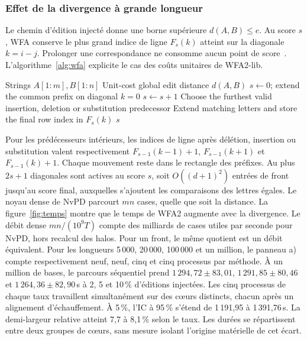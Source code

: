 \subsubsection{Effet de la divergence à grande longueur}
Le chemin d'édition injecté donne une borne supérieure \(d(A,B)\le e\). Au score \(s\), WFA conserve le plus grand indice de ligne \(F_s(k)\) atteint sur la diagonale \(k=i-j\). Prolonger une correspondance ne consomme aucun point de score~\cite{wfa}.
L'algorithme~\ref{alg:wfa} explicite le cas des coûts unitaires de WFA2-lib.
\begin{algorithm}[!htbp]
\caption{Progression d'un front à coûts unitaires}\label{alg:wfa}
\begin{algorithmic}[1]
\Require Strings \(A[1:m],B[1:n]\)
\Ensure Unit-cost global edit distance \(d(A,B)\)
\State \(s\gets0\); extend the common prefix on diagonal \(k=0\)
  \State \(s\gets s+1\)
    \State Choose the furthest valid insertion, deletion or substitution predecessor
    \State Extend matching letters and store the final row index in \(F_s(k)\)
  \EndFor
\EndWhile
\State \Return \(s\)
\end{algorithmic}
\end{algorithm}
Pour les prédécesseurs intérieurs, les indices de ligne après délétion, insertion ou substitution valent respectivement \(F_{s-1}(k-1)+1\), \(F_{s-1}(k+1)\) et \(F_{s-1}(k)+1\). Chaque mouvement reste dans le rectangle des préfixes. Au plus \(2s+1\) diagonales sont actives au score \(s\), soit \(O((d+1)^2)\) entrées de front jusqu'au score final, auxquelles s'ajoutent les comparaisons des lettres égales.
\FloatBarrier
Le noyau dense de NvPD parcourt \(mn\) cases, quelle que soit la distance. La figure~\ref{fig:temps} montre que le temps de WFA2 augmente avec la divergence. Le débit dense \(mn/(10^9 T)\) compte des milliards de cases utiles par seconde pour NvPD, hors recalcul des halos. Pour un front, le même quotient est un débit équivalent.
Pour les longueurs 5\,000, 20\,000, 100\,000 et un million, le panneau a) compte respectivement neuf, neuf, cinq et cinq processus par méthode. À un million de bases, le parcours séquentiel prend \(1\,294{,}72\pm83{,}01\), \(1\,291{,}85\pm80{,}46\) et \(1\,264{,}36\pm82{,}90\)\,s à 2, 5 et 10\,\% d'éditions injectées. Les cinq processus de chaque taux travaillent simultanément sur des cœurs distincts, chacun après un alignement d'échauffement. À 5\,\%, l'IC à 95\,\% s'étend de 1\,191,95 à 1\,391,76\,s. La demi-largeur relative atteint 7,7 à 8,1\,\% selon le taux. Les durées se répartissent entre deux groupes de cœurs, sans mesure isolant l'origine matérielle de cet écart.

